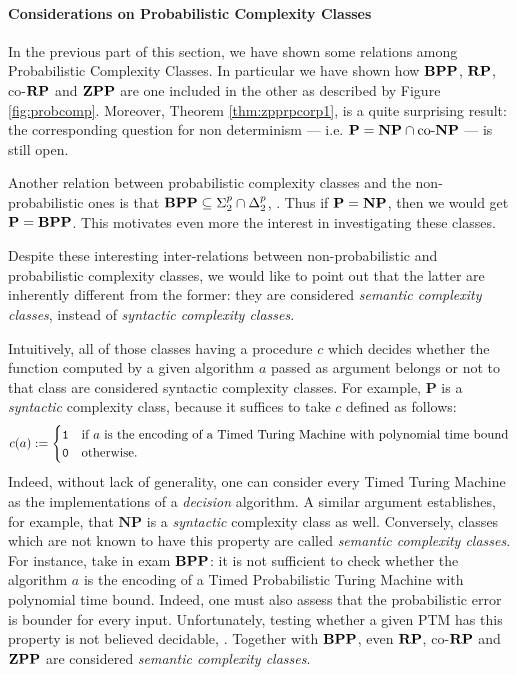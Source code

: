 \paragraph*{Considerations on Probabilistic Complexity Classes}

In the previous part of this section, we have shown some relations among
Probabilistic Complexity Classes. In particular we have shown how
$\mathbf{BPP}$, $\mathbf{RP}$, co-$\mathbf{RP}$ and $\mathbf{ZPP}$ are one included in the
other as described by Figure \ref{fig:probcomp}.
%
Moreover, Theorem \ref{thm:zpprpcorp1}, is a quite
surprising result: the corresponding question for
non determinism --- i.e. $\mathbf P = \mathbf{NP}\cap \text{co-}\mathbf{NP}$ --- is still open.

Another relation between probabilistic complexity classes and the non-probabilistic ones
is that $\mathbf{BPP} \subseteq \Sigma^p_2 \cap \Delta^p_2$, \cite{Goldreich}.
Thus if $\mathbf P = \mathbf{NP}$, then we would get $\mathbf P = \mathbf{BPP}$.
This motivates even more the interest in investigating these classes.

Despite these interesting inter-relations between non-probabilistic and
probabilistic complexity classes, we would like to point out that
the latter are inherently different
from the former:
they are considered \emph{semantic complexity classes}, instead of
\emph{syntactic complexity classes}.

Intuitively, all of those classes having a
procedure $c$ which decides whether the function computed by a given algorithm
$a$ passed as argument belongs or not to that class are considered syntactic complexity classes.
For example, $\mathbf P$ is a \emph{syntactic} complexity class,
because it suffices to take $c$ defined as follows:
$$
c(a):=\begin{cases} \mathtt{1} & \text{if }a\text{ is the encoding of a Timed Turing Machine with polynomial
time bound}\\ \mathtt{0} &\text{otherwise.}\end{cases}
$$
Indeed, without lack of generality, one can consider every Timed Turing Machine as the
implementations of a \emph{decision} algorithm. A similar argument establishes,
for example, that $\mathbf {NP}$ is a \emph{syntactic} complexity class as well.
%
Conversely, classes which are not known to have this property are called
\emph{semantic complexity classes}.
For instance, take in exam $\mathbf{BPP}$:
it is not sufficient to check whether the algorithm $a$
is the encoding of a Timed Probabilistic Turing Machine with polynomial time bound.
Indeed, one must also assess that the probabilistic error
is bounder for every input. Unfortunately,
testing whether a given PTM has this property is not believed decidable, \cite{AroraBarak}.
Together with $\mathbf{BPP}$, even $\mathbf{RP}$, co-$\mathbf{RP}$ and $\mathbf{ZPP}$ are considered
\emph{semantic complexity classes}.

